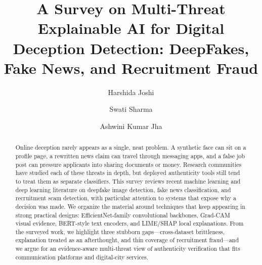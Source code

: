 \documentclass[runningheads]{llncs}
\begin{document}
%
\title{A Survey on Multi-Threat Explainable AI for Digital Deception Detection: DeepFakes, Fake News, and Recruitment Fraud}
%
%
\author{Harshida Joshi \and
Swati Sharma \and
Ashwini Kumar Jha}
%
%
%
\maketitle
%
\begin{abstract}
Online deception rarely appears as a single, neat problem. A synthetic face can sit on a profile page, a rewritten news claim can travel through messaging apps, and a false job post can pressure applicants into sharing documents or money. Research communities have studied each of these threats in depth, but deployed authenticity tools still tend to treat them as separate classifiers. This survey reviews recent machine learning and deep learning literature on deepfake image detection, fake news classification, and recruitment scam detection, with particular attention to systems that expose why a decision was made. We organize the material around techniques that keep appearing in strong practical designs: EfficientNet-family convolutional backbones, Grad-CAM visual evidence, BERT-style text encoders, and LIME/SHAP local explanations. From the surveyed work, we highlight three stubborn gaps---cross-dataset brittleness, explanation treated as an afterthought, and thin coverage of recruitment fraud---and we argue for an evidence-aware multi-threat view of authenticity verification that fits communication platforms and digital-city services.

\end{abstract}
%
\end{document}
